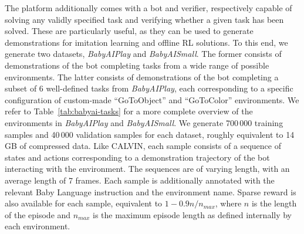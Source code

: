 \documentclass[../main.tex]{subfiles}
\begin{document}
The platform additionally comes with a bot and verifier, respectively capable of solving any validly
specified task and verifying whether a given task has been solved. These are particularly useful, as
they can be used to generate demonstrations for imitation learning and offline RL solutions. To this
end, we generate two datasets, \textit{BabyAIPlay} and \textit{BabyAISmall}. The former consists of
demonstrations of the bot completing tasks from a wide range of possible environments. The latter
consists of demonstrations of the bot completing a subset of 6 well-defined tasks from
\textit{BabyAIPlay}, each corresponding to a specific configuration of custom-made ``GoToObject''
and ``GoToColor'' environments. We refer to Table~\ref{tab:babyai-tasks} for a more complete
overview of the environments in \textit{BabyAIPlay} and \textit{BabyAISmall}. We generate 700\,000
training samples and 40\,000 validation samples for each dataset, roughly equivalent to 14 GB of
compressed data. Like CALVIN, each sample consists of a sequence of states and actions corresponding
to a demonstration trajectory of the bot interacting with the environment. The sequences are of
varying length, with an average length of 7 frames. Each sample is additionally annotated with the
relevant Baby Language instruction and the environment name. Sparse reward is also available for
each sample, equivalent to $1 - 0.9n/n_{max}$, where $n$ is the length of the episode and $n_{max}$
is the maximum episode length as defined internally by each environment.
\end{document}
